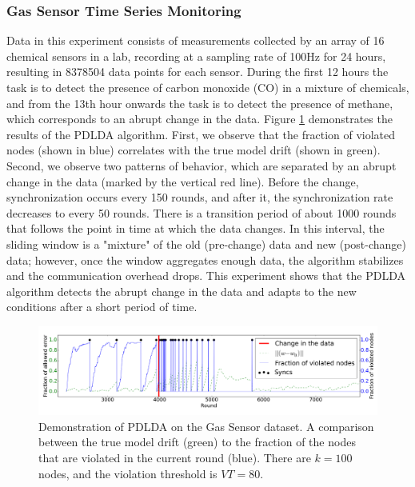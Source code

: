 \subsubsection{Gas Sensor Time Series Monitoring} 
%
Data in this experiment  consists of measurements collected
by an array of 16 chemical sensors in a lab, recording at a sampling
rate of 100Hz for 24 hours, resulting in 8378504 data points for each sensor.
During the first 12 hours the task is to detect the presence of carbon monoxide
(CO) in a mixture of chemicals, and from the 13th hour onwards the task is to detect the presence of methane, 
which corresponds to an abrupt change in the data.
Figure \ref{BigGasOverTime} demonstrates the results of the PDLDA algorithm.
First, we observe that the fraction of violated nodes (shown in blue) correlates with the true model drift (shown in green). Second, we observe two patterns of behavior, which are separated by an abrupt change in the data  (marked by the vertical red line). Before the change,  synchronization occurs every 150 rounds, and after it, 
the synchronization rate decreases to every 50 rounds. There is a transition period of about 1000 rounds that follows the point in time at which the data changes. In this interval, the sliding window is a "mixture" of the old (pre-change) data and new (post-change) data; however, once the window aggregates enough data, the algorithm stabilizes and the communication overhead drops. This experiment shows that the PDLDA algorithm detects the abrupt change in the data and adapts to the new conditions after a short period of time.
\begin{figure}[h!]
\centering
\includegraphics[width=\textwidth]{graphics/overTime100k.png}
\caption{Demonstration of PDLDA on the Gas Sensor dataset.
A comparison between the true model drift (green) to the fraction of the nodes that
are violated in the current round (blue).
There are $k=100$ nodes, and the violation threshold is
$VT=80$.}
\label{BigGasOverTime}
\end{figure}

